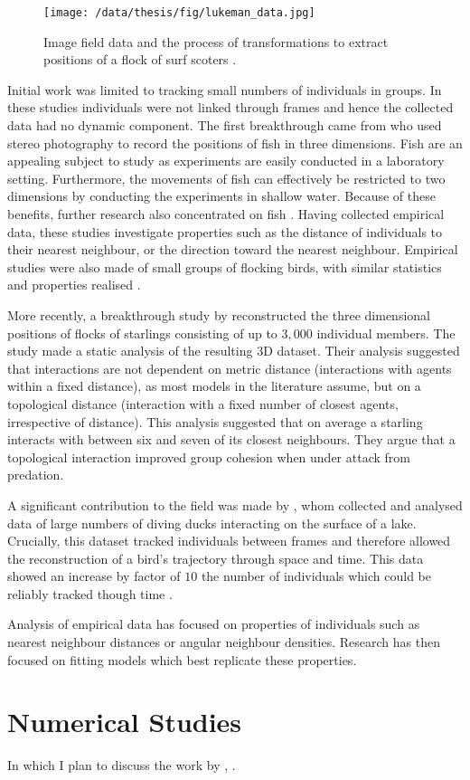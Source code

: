 \begin{figure}
	\centering
	\texttt{[image: /data/thesis/fig/lukeman\_data.jpg]}
	\caption{Image field data and the process of transformations to extract positions of a flock of surf scoters \citep{lukeman10}.}
	\label{fig:lukeman_data}
\end{figure}

Initial work was limited to tracking small numbers of individuals in groups. In these studies individuals were not linked through frames and hence the collected data had no dynamic component. The first breakthrough came from \citet{cullen65} who used stereo photography to record the positions of fish in three dimensions. Fish are an appealing subject to study as experiments are easily conducted in a laboratory setting. Furthermore, the movements of fish can effectively be restricted to two dimensions by conducting the experiments in shallow water. Because of these benefits, further research also concentrated on fish \citep{van_long85, partridge80}. Having collected empirical data, these studies investigate properties such as the distance of individuals to their nearest neighbour, or the direction toward the nearest neighbour. Empirical studies were also made of small groups of flocking birds, with similar statistics and properties realised \citep{major78, budgey98}.

More recently, a breakthrough study by \citet{ballerini08} reconstructed the three dimensional positions of flocks of starlings consisting of up to $3,000$ individual members. The study made a static analysis of the resulting 3D dataset. Their analysis suggested that interactions are not dependent on metric distance (interactions with agents within a fixed distance), as most models in the literature assume, but on a topological distance (interaction with a fixed number of closest agents, irrespective of distance). This analysis suggested that on average a starling interacts with between six and seven of its closest neighbours. They argue that a topological interaction improved group cohesion when under attack from predation.

A significant contribution to the field was made by \citet{lukeman10}, whom collected and analysed data of large numbers of diving ducks interacting on the surface of a lake. Crucially, this dataset tracked individuals between frames and therefore allowed the reconstruction of a bird's trajectory through space and time. This data showed an increase by factor of $10$ the number of individuals which could be reliably tracked though time \citep{lukeman09}.

Analysis of empirical data has focused on properties of individuals such as nearest neighbour distances or angular neighbour densities. Research has then focused on fitting models which best replicate these properties.

\section{Numerical Studies}
\label{sec:numerical_studies}

\color{red} In which I plan to discuss the work by \citet{mann11}, \citet{ballerini}. \color{black}
